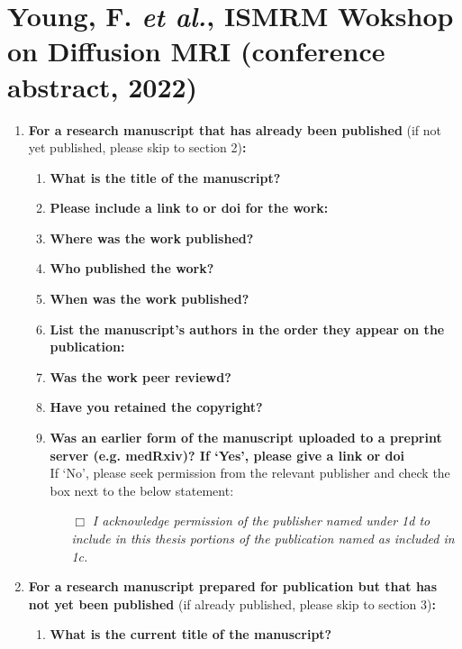 {%
\section*{Young, F. \textit{et al.}, ISMRM Wokshop on Diffusion MRI (conference abstract, 2022)}
\begin{enumerate}[leftmargin=*,label={\bfseries\arabic*.}]\itemsep0em
	\item \textbf{For a research manuscript that has already been published} (if not yet published, please skip to section 2)\textbf{:}
	\begin{enumerate}[label={\alph*)}]\itemsep0em
	\item \textbf{What is the title of the manuscript?}

	\item \textbf{Please include a link to or doi for the work:}

	\item \textbf{Where was the work published?}

	\item \textbf{Who published the work?}

	\item \textbf{When was the work published?}

	\item \textbf{List the manuscript's authors in the order they appear on the publication:}

	\item \textbf{Was the work peer reviewd?}

	\item \textbf{Have you retained the copyright?}

	\item \textbf{Was an earlier form of the manuscript uploaded to a preprint server (e.g. medRxiv)? If ‘Yes’, please give a link or doi}
	\\
	If ‘No’, please seek permission from the relevant publisher and check the box next to the below statement:
\begin{itemize}\itemsep0em
\item[$\Box$] {\itshape I acknowledge permission of the publisher named under 1d to include in this thesis portions of the publication named as included in 1c.}
\end{itemize}
%
\end{enumerate}
%
\item \textbf{For a research manuscript prepared for publication but that has not yet been published} (if already published, please skip to section 3)\textbf{:}
%
\begin{enumerate}[label={\alph*)}]\itemsep0em
	\item \textbf{What is the current title of the manuscript?}


\end{enumerate}
\end{enumerate}}
